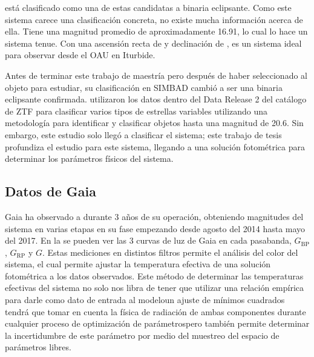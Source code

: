 \textbf{\atoObjIdNoSpace} está clasificado como una de estas candidatas a binaria
eclipsante. Como este sistema carece una clasificación concreta, no existe mucha
información acerca de ella. Tiene una magnitud promedio de aproximadamente
\num{16.91}, lo cual lo hace un sistema tenue. Con una ascensión recta de
 y declinación de , \atoObjId
es un sistema ideal para observar desde el OAU en Iturbide.

Antes de terminar este trabajo de maestría pero después de haber seleccionado al
objeto \atoObjId para estudiar, su clasificación en SIMBAD cambió a ser una
binaria eclipsante confirmada.
 utilizaron los
datos dentro del Data Release 2 del catálogo de ZTF para clasificar varios tipos
de estrellas variables utilizando una metodología para identificar y clasificar
objetos hasta una magnitud de 20.6. Sin embargo, este estudio solo llegó a
clasificar el sistema; este trabajo de tesis profundiza el estudio para este
sistema, llegando a una solución fotométrica para determinar los parámetros
físicos del sistema.

\subsection{Datos de Gaia}

Gaia ha observado a \atoObjId durante 3 años de su operación, obteniendo
magnitudes del sistema en varias etapas en su fase empezando desde agosto del
2014 hasta mayo del 2017. En la  se pueden ver
las 3 curvas de luz de Gaia en cada pasabanda, $G_{\mathrm{BP}}$,
$G_{\mathrm{RP}}$ y $G$. Estas mediciones en distintos filtros permite el
análisis del color del sistema, el cual permite ajustar la temperatura efectiva
de una solución fotométrica a los datos observados. Este método de determinar
las temperaturas efectivas del sistema no solo nos libra de tener que utilizar
una relación empírica para darle como dato de entrada al modelo\textemdash un
ajuste de mínimos cuadrados tendrá que tomar en cuenta la física de radiación de
ambas componentes durante cualquier proceso de optimización de
parámetros\textemdash pero también permite determinar la incertidumbre de este
parámetro por medio del muestreo del espacio de parámetros libres.

